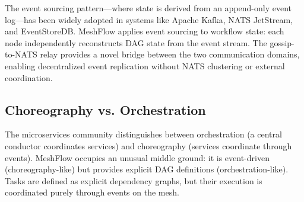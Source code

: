 The event sourcing pattern---where state is derived from an append-only event log---has been widely adopted in systems like Apache Kafka, NATS JetStream, and EventStoreDB. MeshFlow applies event sourcing to workflow state: each node independently reconstructs DAG state from the event stream. The gossip-to-NATS relay provides a novel bridge between the two communication domains, enabling decentralized event replication without NATS clustering or external coordination.

\subsection{Choreography vs. Orchestration}

The microservices community distinguishes between orchestration (a central conductor coordinates services) and choreography (services coordinate through events). MeshFlow occupies an unusual middle ground: it is event-driven (choreography-like) but provides explicit DAG definitions (orchestration-like). Tasks are defined as explicit dependency graphs, but their execution is coordinated purely through events on the mesh.
